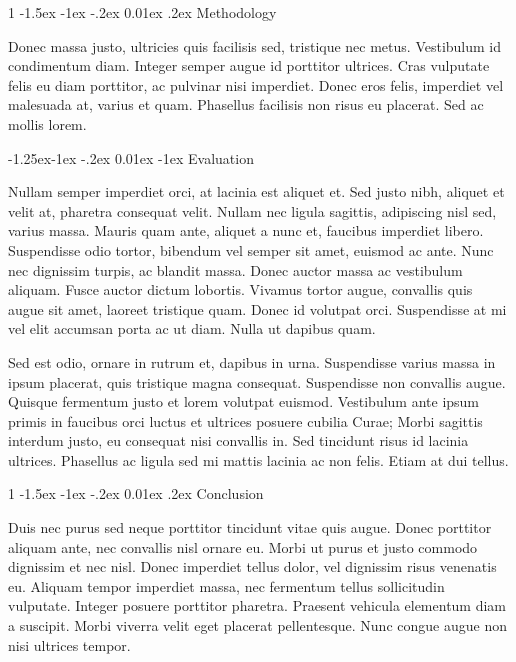 \documentclass[11pt]{article}
\makeatletter
\renewcommand\section{%
  \@startsection {section} %
  {1} %
  {\z@} %
  {-1.5ex \@plus -1ex \@minus -.2ex} %
  {0.01ex \@plus.2ex} %
  {\normalfont\large\bfseries} %
}
\renewcommand\subsection{%
  \@startsection{subsection}{2}{\z@}%
  {-1.25ex\@plus -1ex \@minus -.2ex}%
  {0.01ex \@plus -1ex}%
  {\normalfont\small\bfseries} %
}
\makeatother
\begin{document}
\hypertarget{methodology}{%
\section{Methodology}\label{methodology}}

Donec massa justo, ultricies quis facilisis sed, tristique nec metus.
Vestibulum id condimentum diam. Integer semper augue id porttitor
ultrices. Cras vulputate felis eu diam porttitor, ac pulvinar nisi
imperdiet. Donec eros felis, imperdiet vel malesuada at, varius et quam.
Phasellus facilisis non risus eu placerat. Sed ac mollis lorem.

\hypertarget{evaluation}{%
\subsection{Evaluation}\label{evaluation}}

Nullam semper imperdiet orci, at lacinia est aliquet et. Sed justo nibh,
aliquet et velit at, pharetra consequat velit. Nullam nec ligula
sagittis, adipiscing nisl sed, varius massa. Mauris quam ante, aliquet a
nunc et, faucibus imperdiet libero. Suspendisse odio tortor, bibendum
vel semper sit amet, euismod ac ante. Nunc nec dignissim turpis, ac
blandit massa. Donec auctor massa ac vestibulum aliquam. Fusce auctor
dictum lobortis. Vivamus tortor augue, convallis quis augue sit amet,
laoreet tristique quam. Donec id volutpat orci. Suspendisse at mi vel
elit accumsan porta ac ut diam. Nulla ut dapibus quam.

Sed est odio, ornare in rutrum et, dapibus in urna. Suspendisse varius
massa in ipsum placerat, quis tristique magna consequat. Suspendisse non
convallis augue. Quisque fermentum justo et lorem volutpat euismod.
Vestibulum ante ipsum primis in faucibus orci luctus et ultrices posuere
cubilia Curae; Morbi sagittis interdum justo, eu consequat nisi
convallis in. Sed tincidunt risus id lacinia ultrices. Phasellus ac
ligula sed mi mattis lacinia ac non felis. Etiam at dui tellus.

\hypertarget{conclusion}{%
\section{Conclusion}\label{conclusion}}

Duis nec purus sed neque porttitor tincidunt vitae quis augue. Donec
porttitor aliquam ante, nec convallis nisl ornare eu. Morbi ut purus et
justo commodo dignissim et nec nisl. Donec imperdiet tellus dolor, vel
dignissim risus venenatis eu. Aliquam tempor imperdiet massa, nec
fermentum tellus sollicitudin vulputate. Integer posuere porttitor
pharetra. Praesent vehicula elementum diam a suscipit. Morbi viverra
velit eget placerat pellentesque. Nunc congue augue non nisi ultrices
tempor.
\end{document}
